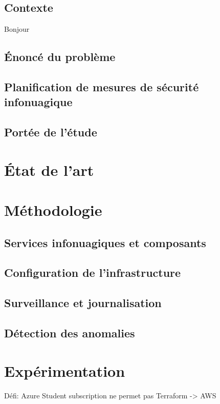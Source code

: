 \documentclass[conference]{IEEEtran}
\begin{document}
\subsection{Contexte}
Bonjour
\subsection{Énoncé du problème}

\subsection{Planification de mesures de sécurité infonuagique}

\subsection{Portée de l'étude}

\section{État de l'art}

\section{Méthodologie}

\subsection{Services infonuagiques et composants}

\subsection{Configuration de l'infrastructure}

\subsection{Surveillance et journalisation}

\subsection{Détection des anomalies}

\section{Expérimentation}

Défi: Azure Student subscription ne permet pas Terraform -> AWS
\end{document}

